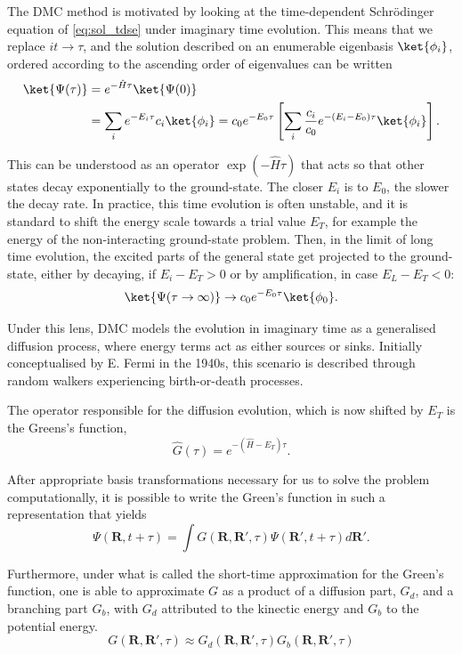 The DMC method is motivated by looking at the time-dependent Schrödinger equation of \eqref{eq:sol_tdse} under imaginary time evolution. This means that we replace $it \to \tau$, and the solution described on an enumerable eigenbasis $\ket{\phi_i}$, ordered according to the ascending order of eigenvalues can be written
\begin{align*}
\ket{\Psi(\tau)} &= e^{-\hat{H}\tau}\ket{\Psi(0)} \\
                &= \sum_i e^{-E_i\tau} c_i\ket{\phi_i} = c_0e^{-E_0\tau}\left[\sum_i \frac{c_i}{c_0}e^{-(E_i - E_0)\tau}\ket{\phi_i}\right].
\end{align*}

This can be understood as an operator $\exp({-\hat{H}\tau})$ that acts so that other states decay exponentially to the ground-state. The closer $E_i$ is to $E_0$, the slower the decay rate. In practice, this time evolution is often unstable, and it is standard to shift the energy scale towards a trial value $E_T$, for example the energy of the non-interacting ground-state problem. Then, in the limit of long time evolution, the excited parts of the general state get projected to the ground-state, either by decaying, if $E_i - E_T > 0 $ or by amplification, in case $E_L- E_T < 0$:
\begin{align*}
\ket{\Psi(\tau \to \infty)} \to c_0 e^{-E_0\tau} \ket{\phi_0}.    
\end{align*}

Under this lens, DMC models the evolution in imaginary time as a generalised diffusion process, where energy terms act as either sources or sinks. Initially conceptualised by E. Fermi in the 1940s, this scenario is described through random walkers experiencing birth-or-death processes. 

The operator responsible for the diffusion evolution, which is now shifted by $E_T$ is the Greens's function,
\begin{equation*}
    \hat{G}(\tau) = e^{-(\hat{H} - E_T)\tau}.
\end{equation*}

After appropriate basis transformations necessary for us to solve the problem computationally, it is possible to write the Green's function in such a representation that yields 
\begin{equation*}
    \Psi(\mathbf{R}, t + \tau) = \int G(\mathbf{R},\mathbf{R}',\tau) \Psi(\mathbf{R}', t + \tau) d\mathbf{R}'.
\end{equation*}

Furthermore, under what is called the short-time approximation for the Green's function, one is able to approximate $G$ as a product of a diffusion part, $G_d$, and a branching part $G_b$, with $G_d$ attributed to the kinectic energy and $G_b$ to the potential energy.
\begin{equation}
    G(\mathbf{R},\mathbf{R}',\tau) \approx G_d(\mathbf{R},\mathbf{R}',\tau)G_b(\mathbf{R},\mathbf{R}',\tau)
\end{equation}


